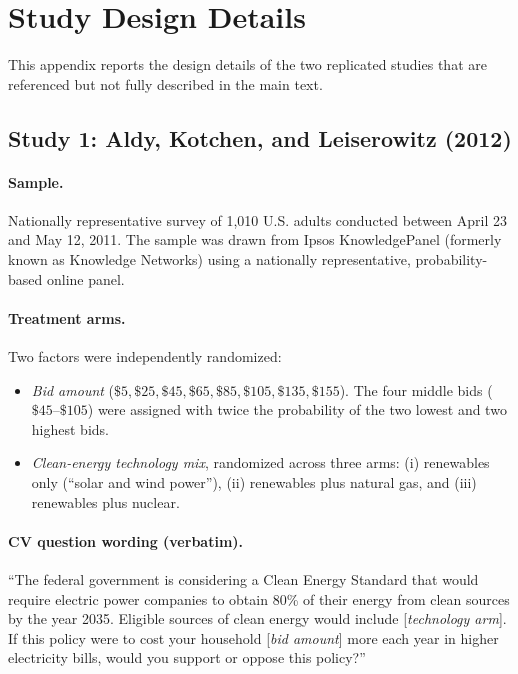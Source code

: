 \documentclass[12pt]{article}
\begin{document}
\newpage
\appendix
\renewcommand{\thefigure}{\thesection.\arabic{figure}}
\renewcommand{\thetable}{\thesection.\arabic{table}}

\section{Study Design Details}\label{app:study-details}

This appendix reports the design details of the two replicated studies that are referenced but not fully described in the main text.

\subsection{Study 1: Aldy, Kotchen, and Leiserowitz (2012)}

\paragraph{Sample.} Nationally representative survey of 1{,}010 U.S. adults conducted between April 23 and May 12, 2011. The sample was drawn from Ipsos KnowledgePanel (formerly known as Knowledge Networks) using a nationally representative, probability-based online panel.

\paragraph{Treatment arms.} Two factors were independently randomized:
\begin{itemize}[noitemsep]
    \item \textit{Bid amount} ($\$5, \$25, \$45, \$65, \$85, \$105, \$135, \$155$). The four middle bids ($\$45$--$\$105$) were assigned with twice the probability of the two lowest and two highest bids.
    \item \textit{Clean-energy technology mix}, randomized across three arms: (i) renewables only (``solar and wind power''), (ii) renewables plus natural gas, and (iii) renewables plus nuclear.
\end{itemize}

\paragraph{CV question wording (verbatim).} ``The federal government is considering a Clean Energy Standard that would require electric power companies to obtain 80\% of their energy from clean sources by the year 2035. Eligible sources of clean energy would include [\textit{technology arm}]. If this policy were to cost your household [\textit{bid amount}] more each year in higher electricity bills, would you support or oppose this policy?''
\end{document}
